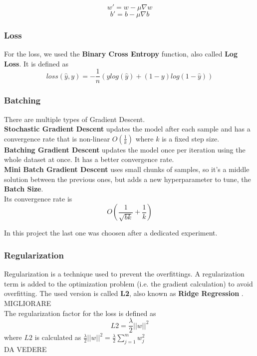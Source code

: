 \documentclass[
	letterpaper, %
	10pt, %
]{class}
\begin{document}
$$ w' = w - \mu \nabla w $$
$$ b' = b - \mu \nabla b $$

\subsubsection{Loss}
For the loss, we used the \textbf{Binary Cross Entropy} \cite{binary_cross_entropy} function, also called \textbf{Log Loss}.
It is defined as
$$ loss(\hat{y}, y) = -\frac{1}{n}(y log(\hat{y}) + (1-y)log(1-\hat{y})) $$

\subsubsection{Batching}
There are multiple types of Gradient Descent.\\

\textbf{Stochastic Gradient Descent} updates the model after each sample and has a convergence rate that is non-linear $O(\frac{1}{k})$ where $k$ is a fixed step size.\\

\textbf{Batching Gradient Descent} updates the model once per iteration using the whole dataset at once. It has a better convergence rate.\\

\textbf{Mini Batch Gradient Descent} \cite{batching} uses small chunks of samples, so it's a middle solution between the previous ones, but adds a new hyperparameter to tune, the \textbf{Batch Size}.\\
Its convergence rate is
$$O(\frac{1}{\sqrt{bk}} + \frac{1}{k})$$

In this project the last one was choosen after a dedicated experiment.

\subsubsection{Regularization}
Regularization is a technique used to prevent the overfittings. A regularization term is added to the optimization problem (i.e. the gradient calculation) to avoid overfitting.
The used version is called \textbf{L2}, also known as \textbf{Ridge Regression} \cite{l2}. MIGLIORARE\\

The regularization factor for the loss is defined as
$$ L2 = \frac{\lambda}{2}||w||^2 $$
where $L2$ is calculated as $ \frac{\lambda}{2}||w||^2 = \frac{\lambda}2{\displaystyle\sum_{j=1}^m w_j^2} $ \\
DA VEDERE
\end{document}
